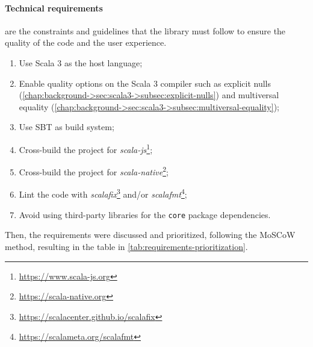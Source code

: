 \paragraph{Technical requirements} are the constraints and guidelines that the library must follow to ensure the quality of the code and the user experience.
\begin{enumerate}[label=\textbf{T.\arabic*}]
    \item Use Scala 3 as the host language;
    \item Enable quality options on the Scala 3 compiler such as explicit nulls (\cref{chap:background->sec:scala3->subsec:explicit-nulls}) and multiversal equality (\cref{chap:background->sec:scala3->subsec:multiversal-equality});
    \item Use \ac{SBT} as build system;
    \item Cross-build the project for \textit{scala-js}\footnote{\url{https://www.scala-js.org}};
    \item Cross-build the project for \textit{scala-native}\footnote{\url{https://scala-native.org}};
    \item Lint the code with \textit{scalafix}\footnote{\url{https://scalacenter.github.io/scalafix}} and/or \textit{scalafmt}\footnote{\url{https://scalameta.org/scalafmt}};
    \item Avoid using third-party libraries for the \texttt{core} package dependencies.
\end{enumerate}

Then, the requirements were discussed and prioritized, following the \ac{MoSCoW} method,
resulting in the table in \cref{tab:requirements-prioritization}.

